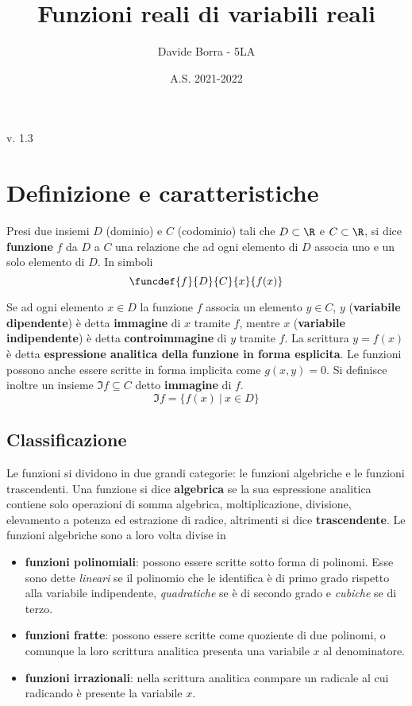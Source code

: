 \documentclass{article}     %
\title{Funzioni reali di variabili reali}
\author{Davide Borra - 5LA}
\date{A.S. 2021-2022}
\begin{document}
    \begin{titlepage}
    \maketitle
    \tableofcontents
    \creativecommons
    \vspace{\fill}
    \hspace{\fill} v. 1.3   %
    \end{titlepage}
    
    \chead{}

    \section{Definizione e caratteristiche}
        \begin{boxdef}
            Presi due insiemi $D$ (dominio) e $C$ (codominio) tali che $D \subset \R$ e $C \subset \R$, si dice \textbf{funzione} $f$ da $D$ a $C$ una relazione che ad ogni elemento di $D$ associa uno e un solo elemento di $D$. In simboli \[\funcdef{f}{D}{C}{x}{f(x)} \]
        \end{boxdef}
        Se ad ogni elemento $x \in D$ la funzione $f$ associa un elemento $y\in C$, $y$ (\textbf{variabile dipendente}) è detta \textbf{immagine} di $x$ tramite $f$, mentre $x$ (\textbf{variabile indipendente}) è detta \textbf{controimmagine} di $y$ tramite $f$. La scrittura $y=f(x)$ è detta \textbf{espressione analitica della funzione in forma esplicita}. Le funzioni possono anche essere scritte in forma implicita come $g(x,y)=0$. Si definisce inoltre un insieme $\Im f\subseteq C$ detto \textbf{immagine} di $f$.
        \[\Im f=\{f(x)\:|\: x \in D\}\] 
    
    \subsection{Classificazione}
        Le funzioni si dividono in due grandi categorie: le funzioni algebriche e le funzioni trascendenti. Una funzione si dice \textbf{algebrica} se la sua espressione analitica contiene solo operazioni di somma algebrica, moltiplicazione, divisione, elevamento a potenza ed estrazione di radice, altrimenti si dice \textbf{trascendente}. Le funzioni algebriche sono a loro volta divise in \begin{itemize}
            \item \textbf{funzioni polinomiali}: possono essere scritte sotto forma di polinomi. Esse sono dette \textit{lineari} se il polinomio che le identifica è di primo grado rispetto alla variabile indipendente, \textit{quadratiche} se è di secondo grado e \textit{cubiche} se di terzo.
            \item \textbf{funzioni fratte}: possono essere scritte come quoziente di due polinomi, o comunque la loro scrittura analitica presenta una variabile $x$ al denominatore.
            \item \textbf{funzioni irrazionali}: nella scrittura analitica conmpare un radicale al cui radicando è presente la variabile $x$.
        \end{itemize}
\end{document}
